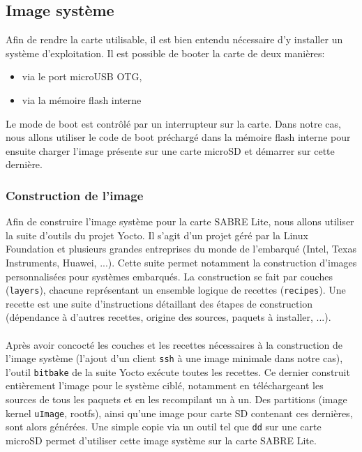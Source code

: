 \subsection{Image système}
Afin de rendre la carte utilisable, il est bien entendu nécessaire d'y installer
un système d'exploitation. Il est possible de booter la carte de deux manières:
\begin{itemize}
  \item via le port microUSB OTG,
  \item via la mémoire flash interne
\end{itemize}
Le mode de boot est contrôlé par un interrupteur sur la carte. Dans notre cas,
nous allons utiliser le code de boot préchargé dans la mémoire flash interne
pour ensuite charger l'image présente sur une carte microSD et démarrer sur
cette dernière.

\subsubsection{Construction de l'image}
Afin de construire l'image système pour la carte SABRE Lite, nous allons
utiliser la suite d'outils du projet Yocto. Il s'agit d'un projet géré par la
Linux Foundation et plusieurs grandes entreprises du monde de l'embarqué (Intel,
 Texas Instruments, Huawei, ...). Cette suite permet notamment la construction
d'images personnalisées pour systèmes embarqués. La construction se fait par
couches (\texttt{layers}), chacune représentant un ensemble logique de recettes
(\texttt{recipes}). Une recette est une suite d'instructions détaillant des 
étapes de construction (dépendance à d'autres recettes, origine des sources,
paquets à installer, ...).\cite{hallinan_create_2015}
\paragraph{} Après avoir concocté les couches et les recettes nécessaires à la
construction de l'image système (l'ajout d'un client \texttt{ssh} à une image
minimale dans notre cas), l'outil \texttt{bitbake}\cite{purdie_bitbake_????}
de la suite Yocto exécute toutes les recettes. Ce dernier construit entièrement
l'image pour le système ciblé, notamment en téléchargeant les sources de tous
les paquets et en les recompilant un à un. Des partitions (image kernel
\texttt{uImage}, rootfs), ainsi qu'une image pour carte SD contenant ces
dernières, sont alors générées. Une simple copie via un outil tel que
\texttt{dd} sur une carte microSD permet d'utiliser cette image système sur la
carte SABRE Lite.
